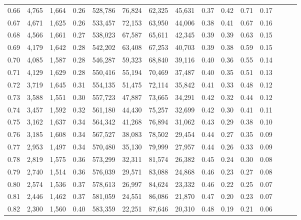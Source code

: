 \begin{tabular}{rrrrrrrrrrrrrrr}
0.66 &   4,765 &  1,664 &  0.26 &  528,786 &   76,824 &   62,325 &   45,631 &  0.37 &  0.42 &  0.71 &      0.17 \\
0.67 &   4,671 &  1,625 &  0.26 &  533,457 &   72,153 &   63,950 &   44,006 &  0.38 &  0.41 &  0.67 &      0.16 \\
0.68 &   4,566 &  1,661 &  0.27 &  538,023 &   67,587 &   65,611 &   42,345 &  0.39 &  0.39 &  0.63 &      0.15 \\
0.69 &   4,179 &  1,642 &  0.28 &  542,202 &   63,408 &   67,253 &   40,703 &  0.39 &  0.38 &  0.59 &      0.15 \\
0.70 &   4,085 &  1,587 &  0.28 &  546,287 &   59,323 &   68,840 &   39,116 &  0.40 &  0.36 &  0.55 &      0.14 \\
0.71 &   4,129 &  1,629 &  0.28 &  550,416 &   55,194 &   70,469 &   37,487 &  0.40 &  0.35 &  0.51 &      0.13 \\
0.72 &   3,719 &  1,645 &  0.31 &  554,135 &   51,475 &   72,114 &   35,842 &  0.41 &  0.33 &  0.48 &      0.12 \\
0.73 &   3,588 &  1,551 &  0.30 &  557,723 &   47,887 &   73,665 &   34,291 &  0.42 &  0.32 &  0.44 &      0.12 \\
0.74 &   3,457 &  1,592 &  0.32 &  561,180 &   44,430 &   75,257 &   32,699 &  0.42 &  0.30 &  0.41 &      0.11 \\
0.75 &   3,162 &  1,637 &  0.34 &  564,342 &   41,268 &   76,894 &   31,062 &  0.43 &  0.29 &  0.38 &      0.10 \\
0.76 &   3,185 &  1,608 &  0.34 &  567,527 &   38,083 &   78,502 &   29,454 &  0.44 &  0.27 &  0.35 &      0.09 \\
0.77 &   2,953 &  1,497 &  0.34 &  570,480 &   35,130 &   79,999 &   27,957 &  0.44 &  0.26 &  0.33 &      0.09 \\
0.78 &   2,819 &  1,575 &  0.36 &  573,299 &   32,311 &   81,574 &   26,382 &  0.45 &  0.24 &  0.30 &      0.08 \\
0.79 &   2,740 &  1,514 &  0.36 &  576,039 &   29,571 &   83,088 &   24,868 &  0.46 &  0.23 &  0.27 &      0.08 \\
0.80 &   2,574 &  1,536 &  0.37 &  578,613 &   26,997 &   84,624 &   23,332 &  0.46 &  0.22 &  0.25 &      0.07 \\
0.81 &   2,446 &  1,462 &  0.37 &  581,059 &   24,551 &   86,086 &   21,870 &  0.47 &  0.20 &  0.23 &      0.07 \\
0.82 &   2,300 &  1,560 &  0.40 &  583,359 &   22,251 &   87,646 &   20,310 &  0.48 &  0.19 &  0.21 &      0.06 \\

\end{tabular}
